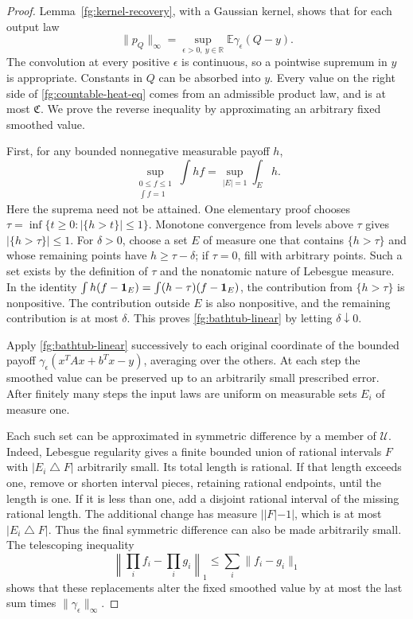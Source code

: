 \begin{proof}
Lemma~\ref{fg:kernel-recovery}, with a Gaussian kernel, shows
that for each output law
\[
 \|p_Q\|_\infty
   =\sup_{\epsilon>0,\ y\in\mathbb R}
                   \mathbb E\gamma_\epsilon(Q-y).
\]
The convolution at every positive $\epsilon$ is continuous,
so a pointwise supremum in $y$ is appropriate.
Constants in $Q$ can be absorbed into $y$.
Every value on the right side of
\eqref{fg:countable-heat-eq} comes from an admissible product
law, and is at most $\mathfrak C$.
We prove the reverse inequality by approximating an
arbitrary fixed smoothed value.

First, for any bounded nonnegative measurable payoff $h$,
\begin{equation}\label{fg:bathtub-linear}
 \sup_{\substack{0\leq f\leq1\\\int f=1}}\int hf
       =\sup_{|E|=1}\int_Eh .
\end{equation}
Here the suprema need not be attained.
One elementary proof chooses
$\tau=\inf\{t\geq0:|\{h>t\}|\leq1\}$.
Monotone convergence from levels above $\tau$ gives
$|\{h>\tau\}|\leq1$.
For $\delta>0$, choose a set $E$ of measure one that contains
$\{h>\tau\}$ and whose remaining points have
$h\geq\tau-\delta$; if $\tau=0$, fill with arbitrary points.
Such a set exists by the definition of $\tau$ and the
nonatomic nature of Lebesgue measure.
In the identity
$\int h(f-{\bf1}_E)=\int(h-\tau)(f-{\bf1}_E)$,
the contribution from $\{h>\tau\}$ is nonpositive.
The contribution outside $E$ is also nonpositive, and
the remaining contribution is at most $\delta$.
This proves \eqref{fg:bathtub-linear} by letting
$\delta\downarrow0$.

Apply \eqref{fg:bathtub-linear} successively to each original
coordinate of the bounded payoff
$\gamma_\epsilon(x^TAx+b^Tx-y)$, averaging over the others.
At each step the smoothed value can be preserved up to an
arbitrarily small prescribed error.
After finitely many steps the input laws are uniform on
measurable sets $E_i$ of measure one.

Each such set can be approximated in symmetric difference
by a member of $\mathcal U$.
Indeed, Lebesgue regularity gives a finite bounded union of
rational intervals $F$ with $|E_i\mathbin\triangle F|$
arbitrarily small.  Its total length is rational.
If that length exceeds one, remove or shorten interval
pieces, retaining rational endpoints, until the length is
one.  If it is less than one, add a disjoint rational
interval of the missing rational length.
The additional change has measure $||F|-1|$, which is at
most $|E_i\mathbin\triangle F|$.
Thus the final symmetric difference can also be made
arbitrarily small.
The telescoping inequality
\[
 \left\|\prod_i f_i-\prod_i g_i\right\|_1
       \leq\sum_i\|f_i-g_i\|_1
\]
shows that these replacements alter the fixed smoothed
value by at most the last sum times
$\|\gamma_\epsilon\|_\infty$.


\end{proof}
